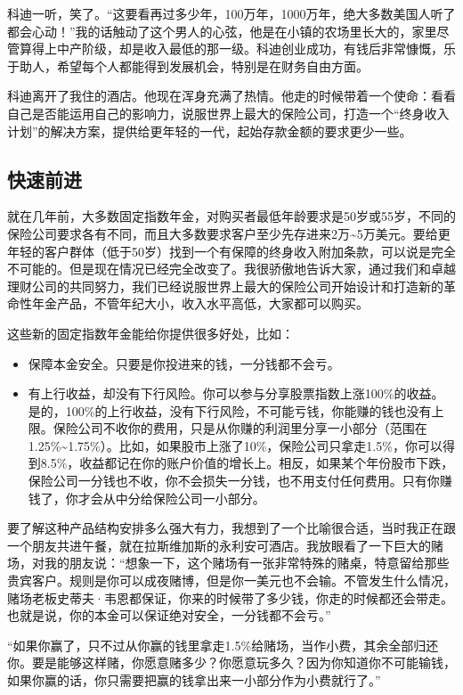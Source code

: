 科迪一听，笑了。“这要看再过多少年，100万年，1000万年，绝大多数美国人听了都会心动！”我的话触动了这个男人的心弦，他是在小镇的农场里长大的，家里尽管算得上中产阶级，却是收入最低的那一级。科迪创业成功，有钱后非常慷慨，乐于助人，希望每个人都能得到发展机会，特别是在财务自由方面。

科迪离开了我住的酒店。他现在浑身充满了热情。他走的时候带着一个使命：看看自己是否能运用自己的影响力，说服世界上最大的保险公司，打造一个“终身收入计划”的解决方案，提供给更年轻的一代，起始存款金额的要求更少一些。

\subsection{快速前进}

就在几年前，大多数固定指数年金，对购买者最低年龄要求是50岁或55岁，不同的保险公司要求各有不同，而且大多数要求客户至少先存进来2万\textasciitilde{}5万美元。要给更年轻的客户群体（低于50岁）找到一个有保障的终身收入附加条款，可以说是完全不可能的。但是现在情况已经完全改变了。我很骄傲地告诉大家，通过我们和卓越理财公司的共同努力，我们已经说服世界上最大的保险公司开始设计和打造新的革命性年金产品，不管年纪大小，收入水平高低，大家都可以购买。

这些新的固定指数年金能给你提供很多好处，比如：

\begin{itemize}
\item 保障本金安全。只要是你投进来的钱，一分钱都不会亏。
\item 有上行收益，却没有下行风险。你可以参与分享股票指数上涨100\%的收益。是的，100\%的上行收益，没有下行风险，不可能亏钱，你能赚的钱也没有上限。保险公司不收你的费用，只是从你赚的利润里分享一小部分（范围在1.25\%\textasciitilde{}1.75\%）。比如，如果股市上涨了10\%，保险公司只拿走1.5\%，你可以得到8.5\%，收益都记在你的账户价值的增长上。相反，如果某个年份股市下跌，保险公司一分钱也不收，你不会损失一分钱，也不用支付任何费用。只有你赚钱了，你才会从中分给保险公司一小部分。
\end{itemize}

要了解这种产品结构安排多么强大有力，我想到了一个比喻很合适，当时我正在跟一个朋友共进午餐，就在拉斯维加斯的永利安可酒店。我放眼看了一下巨大的赌场，对我的朋友说：“想象一下，这个赌场有一张非常特殊的赌桌，特意留给那些贵宾客户。规则是你可以成夜赌博，但是你一美元也不会输。不管发生什么情况，赌场老板史蒂夫·韦恩都保证，你来的时候带了多少钱，你走的时候都还会带走。也就是说，你的本金可以保证绝对安全，一分钱都不会亏。”

“如果你赢了，只不过从你赢的钱里拿走1.5\%给赌场，当作小费，其余全部归还你。要是能够这样赌，你愿意赌多少？你愿意玩多久？因为你知道你不可能输钱，如果你赢的话，你只需要把赢的钱拿出来一小部分作为小费就行了。”

